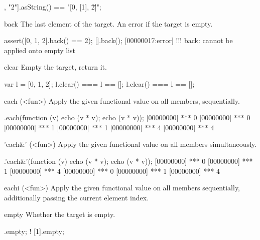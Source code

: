 \begin{urbiscriptapi}
\begin{urbiassert}
[0, [1], "2"].asString() == "[0, [1], \"2\"]";
\end{urbiassert}


\item[back]
  The last element of the target. An error if the target is empty.

\begin{urbiscript}
assert([0, 1, 2].back() == 2);
[].back();
[00000017:error] !!! back: cannot be applied onto empty list
\end{urbiscript}


\item[clear]
  Empty the target, return it.

\begin{urbiassert}
var l = [0, 1, 2];
l.clear() === l == [];
l.clear() === l == [];
\end{urbiassert}


\item[each](<fun>)%
  Apply the given functional value  on all members, sequentially.

\begin{urbiscript}
[0, 1, 2].each(function (v) {echo (v * v); echo (v * v)});
[00000000] *** 0
[00000000] *** 0
[00000000] *** 1
[00000000] *** 1
[00000000] *** 4
[00000000] *** 4
\end{urbiscript}


\item['each&'](<fun>)%
Apply the given functional value on all members simultaneously.

\begin{urbiscript}
[0, 1, 2].'each&'(function (v) {echo (v * v); echo (v * v)});
[00000000] *** 0
[00000000] *** 1
[00000000] *** 4
[00000000] *** 0
[00000000] *** 1
[00000000] *** 4
\end{urbiscript}


\item[eachi](<fun>)%
  Apply the given functional value  on all members
  sequentially, additionally passing the current element index.



\item[empty]
  Whether the target is empty.

\begin{urbiassert}
   [].empty;
! [1].empty;
\end{urbiassert}



\end{urbiscriptapi}
